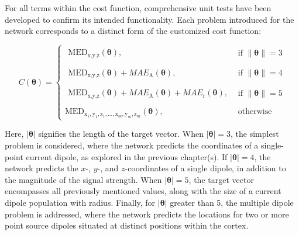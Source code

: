 \documentclass[a4paper, UKenglish, 11pt]{uiomaster}
\begin{document}
For all terms within the cost function, comprehensive unit tests have been developed to confirm its intended functionality. Each problem introduced for the network corresponds to a distinct form of the customized cost function:

\begin{equation}
    C(\boldsymbol{\theta}) =
    \begin{cases}
      \begin{array}{l}
      \text{MED}_{\text{x,y,z}}(\boldsymbol{\theta}),
      \end{array} & \text{if } \| \boldsymbol{\theta} \| = 3\\
      \\
      \begin{array}{l}
      \text{MED}_{\text{x,y,z}}(\boldsymbol{\theta}) + MAE_{\text{A}}(\boldsymbol{\theta}),
      \end{array} & \text{if } \| \boldsymbol{\theta} \| = 4\\
      \\
      \begin{array}{l}
      \text{MED}_{\text{x,y,z}}(\boldsymbol{\theta}) + MAE_{\text{A}}(\boldsymbol{\theta}) + MAE_{\text{r}}(\boldsymbol{\theta}),
      \end{array} & \text{if } \| \boldsymbol{\theta} \| = 5\\
      \\
      \text{MED}_{\text{x}_1,\text{y}_1,\text{z}_1,\ldots,\text{x}_m,\text{y}_m,\text{z}_m}(\boldsymbol{\theta}), & \text{otherwise}
    \end{cases}
    \label{eq:cost_function}
\end{equation}

Here, $| \boldsymbol{\theta} |$ signifies the length of the target vector. When $| \boldsymbol{\theta} | = 3$, the simplest problem is considered, where the network predicts the coordinates of a single-point current dipole, as explored in the previous chapter(s). If $| \boldsymbol{\theta} | = 4$, the network predicts the $x$-, $y$-, and $z$-coordinates of a single dipole, in addition to the magnitude of the signal strength. When $| \boldsymbol{\theta} | = 5$, the target vector encompasses all previously mentioned values, along with the size of a current dipole population with radius. Finally, for $| \boldsymbol{\theta} |$ greater than 5, the multiple dipole problem is addressed, where the network predicts the locations for two or more point source dipoles situated at distinct positions within the cortex.
\end{document}
